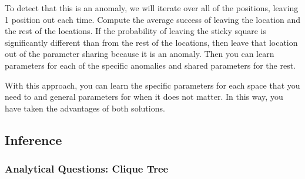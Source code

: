 \documentclass[11pt,a4paper]{article}
\begin{document}
\begin{enumerate}
		To detect that this is an anomaly, we will iterate over all of the positions, leaving 1
		position out each time. Compute the average success of leaving the location and 
		the rest of the locations. If the probability of leaving the sticky square is significantly
		different than from the rest of the locations, then leave that location out of the 
		parameter sharing because it is an anomaly. Then you can learn parameters for 
		each of the specific anomalies and shared parameters for the rest. 
		
		With this approach, you can learn the specific parameters for each space that you
		need to and general parameters for when it does not matter. In this way, you have
		taken the advantages of both solutions.

	\end{enumerate}
	
	\subsection{Inference}
	
	\subsubsection{Analytical Questions: Clique Tree}
	
\end{document}
